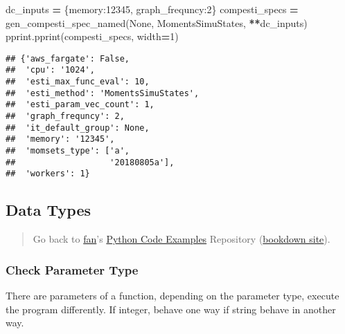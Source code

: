 \documentclass[
]{book}
\newenvironment{Shaded}{\begin{snugshade}}{\end{snugshade}}
\newcommand{\DecValTok}[1]{\textcolor[rgb]{0.00,0.00,0.81}{#1}}
\newcommand{\NormalTok}[1]{#1}
\newcommand{\OperatorTok}[1]{\textcolor[rgb]{0.81,0.36,0.00}{\textbf{#1}}}
\newcommand{\StringTok}[1]{\textcolor[rgb]{0.31,0.60,0.02}{#1}}
\newcommand{\VariableTok}[1]{\textcolor[rgb]{0.00,0.00,0.00}{#1}}
\begin{document}
\begin{Shaded}
\begin{Highlighting}[]
\NormalTok{dc\_inputs }\OperatorTok{=}\NormalTok{ \{}\StringTok{\textquotesingle{}memory\textquotesingle{}}\NormalTok{:}\DecValTok{12345}\NormalTok{, }\StringTok{\textquotesingle{}graph\_frequncy\textquotesingle{}}\NormalTok{:}\DecValTok{2}\NormalTok{\}}
\NormalTok{compesti\_specs }\OperatorTok{=}\NormalTok{ gen\_compesti\_spec\_named(}\VariableTok{None}\NormalTok{, }\StringTok{\textquotesingle{}MomentsSimuStates\textquotesingle{}}\NormalTok{, }\OperatorTok{**}\NormalTok{dc\_inputs)}
\NormalTok{pprint.pprint(compesti\_specs, width}\OperatorTok{=}\DecValTok{1}\NormalTok{)}
\end{Highlighting}
\end{Shaded}

\begin{verbatim}
## {'aws_fargate': False,
##  'cpu': '1024',
##  'esti_max_func_eval': 10,
##  'esti_method': 'MomentsSimuStates',
##  'esti_param_vec_count': 1,
##  'graph_frequncy': 2,
##  'it_default_group': None,
##  'memory': '12345',
##  'momsets_type': ['a',
##                   '20180805a'],
##  'workers': 1}
\end{verbatim}

\hypertarget{data-types}{%
\subsection{Data Types}\label{data-types}}

\begin{quote}
Go back to \href{http://fanwangecon.github.io/}{fan}'s \href{https://fanwangecon.github.io/pyfan/}{Python Code Examples} Repository (\href{https://fanwangecon.github.io/pyfan/bookdown}{bookdown site}).
\end{quote}

\hypertarget{check-parameter-type}{%
\subsubsection{Check Parameter Type}\label{check-parameter-type}}

There are parameters of a function, depending on the parameter type, execute the program differently. If integer, behave one way if string behave in another way.
\end{document}
